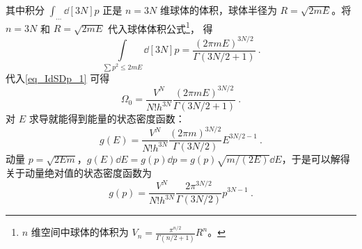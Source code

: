 其中积分 $\int_{\dots} \dd[3N]{p} $ 正是 $n=3N$ 维球体的体积，球体半径为 $R = \sqrt{2mE}$。将 $n=3N$ 和 $R = \sqrt{2mE} $ 代入球体体积公式\footnote{$n$ 维空间中球体的体积为
$V_n = \frac{\pi^{n/2}}{\Gamma(n/2+1)}R^n$。}， 得
\begin{equation}
\int\limits_{\sum p^2 \leqslant 2mE} \dd[3N]{p} = \frac{(2\pi mE)^{3N/2}}{\Gamma(3N/2+1)}~.
\end{equation}
代入\autoref{eq_IdSDp_1} 可得
\begin{equation}\label{eq_IdSDp_2}
\Omega_0 = \frac{V^N}{N! h^{3N}} \frac{(2\pi mE)^{3N/2}}{\Gamma(3N/2+1)}~.
\end{equation}
对 $E$ 求导就能得到能量的状态密度函数：
\begin{equation}\label{eq_IdSDp_3}
g(E) = \frac{V^N}{N! h^{3N}} \frac{(2\pi m)^{3N/2}}{\Gamma(3N/2)} E^{3N/2 - 1}~.
\end{equation}
动量 $p=\sqrt{2Em}$，$g(E)\dd E=g(p)\dd p=g(p)\sqrt{m/(2E)}\dd E$，于是可以解得关于动量绝对值的状态密度函数为
\begin{equation}\label{eq_IdSDp_4}
g(p) = \frac{V^N}{N! h^{3N}} \frac{2\pi^{3N/2}}{\Gamma(3N/2)} p^{3N - 1}~.
\end{equation}